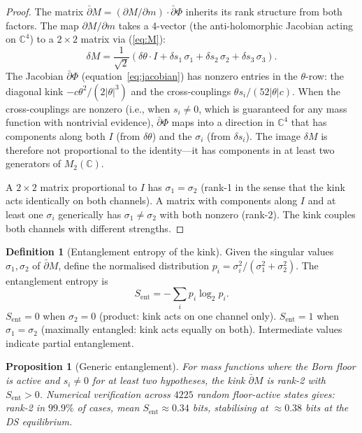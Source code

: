 \documentclass[11pt,a4paper]{article}
\newtheorem{proposition}[theorem]{Proposition}
\theoremstyle{definition}
\newtheorem{definition}[theorem]{Definition}
\theoremstyle{remark}
\newcommand{\C}{\mathbb{C}}
\newcommand{\dbar}{\bar{\partial}}
\begin{document}
\begin{proof}
The matrix $\dbar M = (\partial M/\partial m)\cdot\dbar\Phi$ inherits its rank structure from both factors. The map $\partial M/\partial m$ takes a 4-vector (the anti-holomorphic Jacobian acting on $\C^4$) to a $2\times 2$ matrix via (\ref{eq:M}):
\[
\delta M = \frac{1}{\sqrt{2}}(\delta\theta\cdot I + \delta s_1\,\sigma_1 + \delta s_2\,\sigma_2 + \delta s_3\,\sigma_3).
\]
The Jacobian $\dbar\Phi$ (equation~\ref{eq:jacobian}) has nonzero entries in the $\theta$-row: the diagonal kink $-c\theta^2/(2|\theta|^3)$ and the cross-couplings $\theta s_i/(52|\theta|c)$. When the cross-couplings are nonzero (i.e., when $s_i\neq 0$, which is guaranteed for any mass function with nontrivial evidence), $\dbar\Phi$ maps into a direction in $\C^4$ that has components along both $I$ (from $\delta\theta$) and the $\sigma_i$ (from $\delta s_i$). The image $\delta M$ is therefore not proportional to the identity---it has components in at least two generators of $M_2(\C)$.

A $2\times 2$ matrix proportional to $I$ has $\sigma_1=\sigma_2$ (rank-1 in the sense that the kink acts identically on both channels). A matrix with components along $I$ and at least one $\sigma_i$ generically has $\sigma_1\neq\sigma_2$ with both nonzero (rank-2). The kink couples both channels with different strengths.
\end{proof}

\begin{definition}[Entanglement entropy of the kink]\label{def:ent}
Given the singular values $\sigma_1,\sigma_2$ of $\dbar M$, define the normalised distribution $p_i=\sigma_i^2/(\sigma_1^2+\sigma_2^2)$. The entanglement entropy is
\begin{equation}\label{eq:ent}
S_{\mathrm{ent}} = -\sum_i p_i\log_2 p_i.
\end{equation}
$S_{\mathrm{ent}}=0$ when $\sigma_2=0$ (product: kink acts on one channel only). $S_{\mathrm{ent}}=1$ when $\sigma_1=\sigma_2$ (maximally entangled: kink acts equally on both). Intermediate values indicate partial entanglement.
\end{definition}

\begin{proposition}[Generic entanglement]\label{prop:generic_ent}
For mass functions where the Born floor is active and $s_i\neq 0$ for at least two hypotheses, the kink $\dbar M$ is rank-2 with $S_{\mathrm{ent}}>0$. Numerical verification across $4225$ random floor-active states gives: rank-2 in $99.9\%$ of cases, mean $S_{\mathrm{ent}}\approx 0.34$ bits, stabilising at $\approx 0.38$ bits at the DS equilibrium.
\end{proposition}
\end{document}
